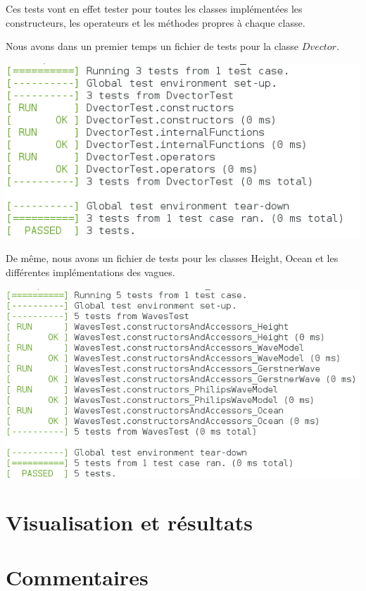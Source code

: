\documentclass{article}
\begin{document}
Ces tests vont en effet tester pour toutes les classes implémentées les constructeurs, les operateurs et les méthodes propres à chaque classe.

Nous avons dans un premier temps un fichier de tests pour la classe $Dvector$.

\vspace{0.5cm}

\includegraphics[scale=0.7]{./res/Test_Dvector.png}

\vspace{0.5cm}

De même, nous avons un fichier de tests pour les classes Height, Ocean et les différentes implémentations des vagues.

\vspace{0.5cm}

\includegraphics[scale=0.7]{./res/Test_Waves.png}

\vspace{1cm}


\section{Visualisation et résultats}

\vspace{1cm}

\section{Commentaires}
\end{document}
